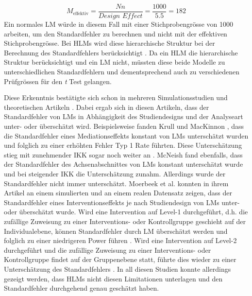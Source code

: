 \documentclass[12pt]{article}\usepackage[]{graphicx}\usepackage[]{color}
\begin{document}
\begin{equation}
M_{\text{effektiv}} = \frac{Nn}{\textit{Design Effect}} = \frac{1000}{5.5} = 182
\end{equation}
Ein normales LM würde in diesem Fall mit einer Stichprobengrösse von 1000 arbeiten, um den Standardfehler zu berechnen und nicht mit der effektiven Stichprobengrösse. Bei HLMs wird diese hierarchische Struktur bei der Berechnung des Standardfehlers berücksichtigt \citep{snijdersbosker1993SEcalc}. Da ein HLM die hierarchische Struktur berücksichtigt und ein LM nicht, müssten diese beide Modelle zu unterschiedlichen Standardfehlern und dementsprechend auch zu verschiedenen Prüfgrössen für den \textit{t} Test gelangen. 

Diese Erkenntnis bestätigte sich schon in mehreren Simulationsstudien und theoretischen Artikeln \citep[z.B.][]{guo2005groupeddatahlm, krullmackinnon2010mediation, mcneish2014analyzing, MOERBEEK2003341}. Dabei ergab sich in diesen Artikeln, dass der Standardfehler von LMs in Abhängigkeit des Studiendesigns und der Analyseart unter- oder überschätzt wird. Beispielsweise fanden Krull und MacKinnon \citeyearpar{krullmackinnon2010mediation}, dass die Standardfehler eines Mediationseffekts konstant von LMs unterschätzt wurden und folglich zu einer erhöhten Fehler Typ 1 Rate führten. Diese Unterschätzung stieg mit zunehmender IKK sogar noch weiter an \citep{krullmackinnon2010mediation}. McNeish \citeyearpar{mcneish2014analyzing} fand ebenfalls, dass der Standardfehler des Achsenabschnittes von LMs konstant unterschätzt wurde und bei steigender IKK die Unterschätzung zunahm. Allerdings wurde der Standardfehler nicht immer unterschätzt. Moerbeek et al. \citeyearpar{MOERBEEK2003341} konnten in ihrem Artikel an einem simulierten und an einem realen Datensatz zeigen, dass der Standardfehler eines Interventionseffekts je nach Studiendesign von LMs unter- oder überschätzt wurde. Wird eine Intervention auf Level-1 durchgeführt, d.h. die zufällige Zuweisung zu einer Interventions- oder Kontrollgruppe geschieht auf der Individualebene, können Standardfehler durch LM überschätzt werden und folglich zu einer niedrigeren Power führen \citep{MOERBEEK2003341}. Wird eine Intervention auf Level-2 durchgeführt und die zufällige Zuweisung zu einer Interventions- oder Kontrollgruppe findet auf der Gruppenebene statt, führte dies wieder zu einer Unterschätzung des Standardfehlers \citep{MOERBEEK2003341}. In all diesen Studien konnte allerdings gezeigt werden, dass HLMs nicht diesen Limitationen unterlagen und den Standardfehler durchgehend genau geschätzt haben.
\end{document}
